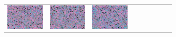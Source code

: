 \documentclass{ipol}
\begin{document}
\begin{figure}[ht]
\begin{subfigure}[t]{\linewidth}
\begin{tabular}{ccccccccc}
                \includegraphics[width=\s]{images/carnival/LINEAR/iso_j95_64_grids.png}&
                \includegraphics[width=\s]{images/carnival/PPG/iso_j95_64_grids.png}&
                \includegraphics[width=\s]{images/carnival/VNG/iso_j95_64_grids.png}\\

\end{tabular}
\end{subfigure}
\end{figure}
\end{document}
